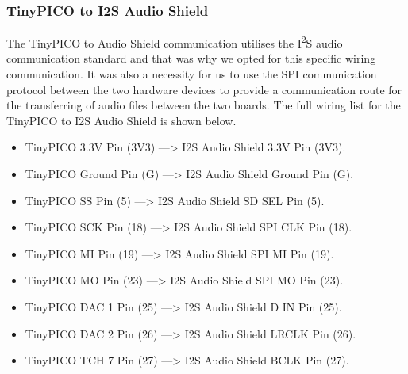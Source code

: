 			\subsubsection{TinyPICO to I2S Audio Shield}

				The TinyPICO to Audio Shield communication utilises the I\textsuperscript{2}S audio communication standard and that was why we opted for this specific wiring communication. It was also a necessity for us to use the SPI communication protocol between the two hardware devices to provide a communication route for the transferring of audio files between the two boards. The full wiring list for the TinyPICO to I2S Audio Shield is shown below.

				\begin{itemize}
					\item TinyPICO 3.3V Pin (3V3) \hspace{2.1em} ---> \hspace{2em} I2S Audio Shield 3.3V Pin (3V3).
					\item TinyPICO Ground Pin (G) \hspace{2em} ---> \hspace{2em} I2S Audio Shield Ground Pin (G).
					\item TinyPICO SS Pin (5) \hspace{4.15em} ---> \hspace{2em} I2S Audio Shield SD SEL Pin (5).
					\item TinyPICO SCK Pin (18) \hspace{2.8em} ---> \hspace{2em} I2S Audio Shield SPI CLK Pin (18).
					\item TinyPICO MI Pin (19) \hspace{3.55em} ---> \hspace{2em} I2S Audio Shield SPI MI Pin (19).
					\item TinyPICO MO Pin (23) \hspace{3.15em} ---> \hspace{2em} I2S Audio Shield SPI MO Pin (23).
					\item TinyPICO DAC 1 Pin (25) \hspace{2em} ---> \hspace{2em} I2S Audio Shield D IN Pin (25).
					\item TinyPICO DAC 2 Pin (26) \hspace{2em} ---> \hspace{2em} I2S Audio Shield LRCLK Pin (26).
					\item TinyPICO TCH 7 Pin (27) \hspace{2em} ---> \hspace{2em} I2S Audio Shield BCLK Pin (27).
				\end{itemize}

